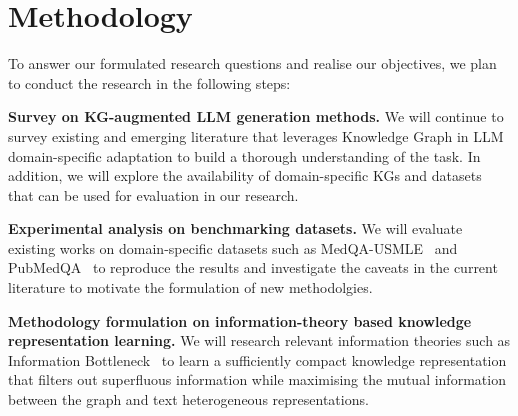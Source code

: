 \section*{Methodology}

To answer our formulated research questions and realise our objectives, we plan to conduct the research in the following steps:

\textbf{Survey on KG-augmented LLM generation methods. } 
We will continue to survey existing and emerging literature that leverages Knowledge Graph in LLM domain-specific adaptation to build a thorough understanding of the task. 
In addition, we will explore the availability of domain-specific KGs and datasets that can be used for evaluation in our research.

\textbf{Experimental analysis on benchmarking datasets. } 
We will evaluate existing works on domain-specific datasets such as MedQA-USMLE~\parencite{medqa} and PubMedQA~\parencite{pubmedqa} to reproduce the results and investigate the caveats in the current literature to motivate the formulation of new methodolgies.

\textbf{Methodology formulation on information-theory based knowledge representation learning. } 
We will research relevant information theories such as Information Bottleneck~\parencite{IB, vib, gib} to learn a sufficiently compact knowledge representation that filters out superfluous information while maximising the mutual information between the graph and text heterogeneous representations.

